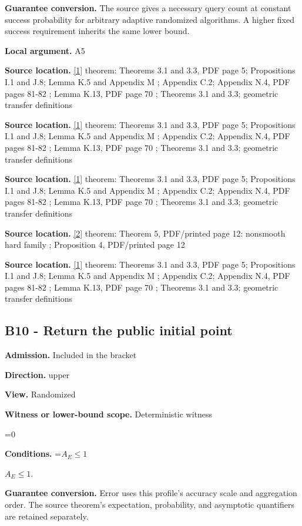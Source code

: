 \documentclass[10pt,a4paper]{article}
\newcommand{\AtlasMath}[1]{\par\begingroup\centering\setbox0=\hbox{$\displaystyle #1$}\ifdim\wd0>1.4\linewidth\typeout{ATLAS WIDE FORMULA: \the\wd0}\fi\ifdim\wd0>\linewidth\resizebox{\linewidth}{!}{\box0}\else\box0\fi\par\endgroup}
\newcommand{\AtlasInlineMath}[1]{\begingroup\setbox0=\hbox{$#1$}\ifdim\wd0>.4\linewidth\endgroup\AtlasMath{#1}\else\endgroup$#1$\fi}
\begin{document}
\textbf{Guarantee conversion.} The source gives a necessary query count at constant success probability for arbitrary adaptive randomized algorithms. A higher fixed success requirement inherits the same lower bound.

\textbf{Local argument.} A5

\textbf{Source location.} \href{https://arxiv.org/html/2610.00345v1}{[1]} theorem: Theorems 3.1 and 3.3, PDF page 5; Propositions I.1 and J.8; Lemma K.5 and Appendix M ; Appendix C.2; Appendix N.4, PDF pages 81-82 ; Lemma K.13, PDF page 70 ; Theorems 3.1 and 3.3; geometric transfer definitions

\textbf{Source location.} \href{https://arxiv.org/html/2610.00345v1}{[1]} theorem: Theorems 3.1 and 3.3, PDF page 5; Propositions I.1 and J.8; Lemma K.5 and Appendix M ; Appendix C.2; Appendix N.4, PDF pages 81-82 ; Lemma K.13, PDF page 70 ; Theorems 3.1 and 3.3; geometric transfer definitions

\textbf{Source location.} \href{https://arxiv.org/html/2610.00345v1}{[1]} theorem: Theorems 3.1 and 3.3, PDF page 5; Propositions I.1 and J.8; Lemma K.5 and Appendix M ; Appendix C.2; Appendix N.4, PDF pages 81-82 ; Lemma K.13, PDF page 70 ; Theorems 3.1 and 3.3; geometric transfer definitions

\textbf{Source location.} \href{https://arxiv.org/html/2607.16558v2}{[2]} theorem: Theorem 5, PDF/printed page 12: nonsmooth hard family ; Proposition 4, PDF/printed page 12

\textbf{Source location.} \href{https://arxiv.org/html/2610.00345v1}{[1]} theorem: Theorems 3.1 and 3.3, PDF page 5; Propositions I.1 and J.8; Lemma K.5 and Appendix M ; Appendix C.2; Appendix N.4, PDF pages 81-82 ; Lemma K.13, PDF page 70 ; Theorems 3.1 and 3.3; geometric transfer definitions

\subsection{B10 - Return the public initial point}
\textbf{Admission.} Included in the bracket

\textbf{Direction.} upper

\textbf{View.} Randomized

\textbf{Witness or lower-bound scope.} Deterministic witness

\AtlasMath{0}
\textbf{Conditions.} \AtlasInlineMath{A_E\le1}.

\textbf{Guarantee conversion.} Error uses this profile's accuracy scale and aggregation order. The source theorem's expectation, probability, and asymptotic quantifiers are retained separately.
\end{document}
